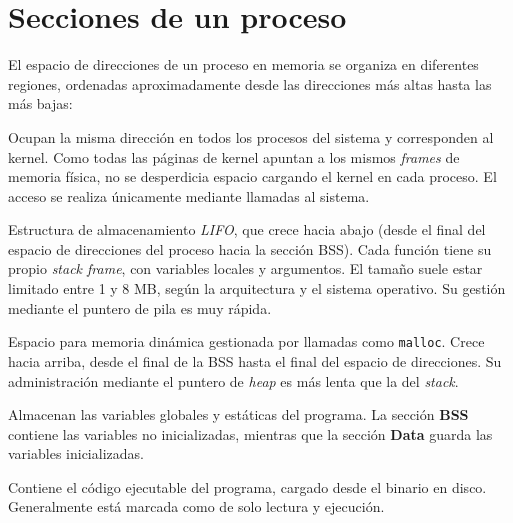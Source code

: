 \section{Secciones de un proceso}

El espacio de direcciones de un proceso en memoria se organiza en diferentes regiones,
ordenadas aproximadamente desde las direcciones más altas hasta las más bajas:

\begin{description}[style=nextline, leftmargin=2cm]

    \item[\textbf{Páginas del Kernel}]  
    Ocupan la misma dirección en todos los procesos del sistema y corresponden al kernel.  
    Como todas las páginas de kernel apuntan a los mismos \textit{frames} de memoria física, 
    no se desperdicia espacio cargando el kernel en cada proceso.  
    El acceso se realiza únicamente mediante llamadas al sistema.

    \item[\textbf{Stack (lectura y escritura)}]  
    Estructura de almacenamiento \textit{LIFO}, que crece hacia abajo 
    (desde el final del espacio de direcciones del proceso hacia la sección BSS).  
    Cada función tiene su propio \textit{stack frame}, con variables locales y argumentos.  
    El tamaño suele estar limitado entre 1 y 8 MB, según la arquitectura y el sistema operativo.  
    Su gestión mediante el puntero de pila es muy rápida.

    \item[\textbf{Heap (lectura y escritura)}]  
    Espacio para memoria dinámica gestionada por llamadas como \texttt{malloc}.  
    Crece hacia arriba, desde el final de la BSS hasta el final del espacio de direcciones.  
    Su administración mediante el puntero de \textit{heap} es más lenta que la del \textit{stack}.

    \item[\textbf{BSS y Data (lectura y escritura)}]  
    Almacenan las variables globales y estáticas del programa.  
    La sección \textbf{BSS} contiene las variables no inicializadas,  
    mientras que la sección \textbf{Data} guarda las variables inicializadas.

    \item[\textbf{Text (lectura y ejecución)}]  
    Contiene el código ejecutable del programa, cargado desde el binario en disco.  
    Generalmente está marcada como de solo lectura y ejecución.

\end{description}

